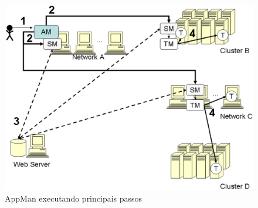 \begin{figure}[htb]
\begin{center}
\includegraphics[scale=0.13]{./img/AppMan.eps}
\caption{AppMan executando principais passos}
\label{fig:AppMan}
\end{center}
\end{figure}